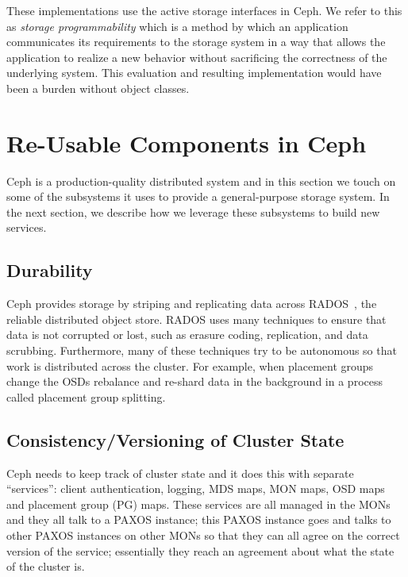 \documentclass[10pt,twocolumn]{article}
\begin{document}
These implementations use the active storage interfaces in Ceph. We
refer to this as \emph{storage programmability} which is a method by
which an application communicates its requirements to the storage system
in a way that allows the application to realize a new behavior without
sacrificing the correctness of the underlying system. This evaluation
and resulting implementation would have been a burden without object
classes.

\section{Re-Usable Components in
Ceph}\label{re-usable-components-in-ceph}

\label{background}

Ceph is a production-quality distributed system and in this section we
touch on some of the subsystems it uses to provide a general-purpose
storage system. In the next section, we describe how we leverage these
subsystems to build new services.

\subsection{Durability}\label{durability}

Ceph provides storage by striping and replicating data across RADOS~\cite{weil_rados_2007}, the reliable distributed object store. RADOS
uses many techniques to ensure that data is not corrupted or lost, such
as erasure coding, replication, and data scrubbing. Furthermore, many of
these techniques try to be autonomous so that work is distributed across
the cluster. For example, when placement groups change the OSDs
rebalance and re-shard data in the background in a process called
placement group splitting.

\subsection{Consistency/Versioning of Cluster
State}\label{consistencyversioning-of-cluster-state}

Ceph needs to keep track of cluster state and it does this with separate
``services'': client authentication, logging, MDS maps, MON maps, OSD
maps and placement group (PG) maps. These services are all managed in
the MONs and they all talk to a PAXOS instance; this PAXOS instance goes
and talks to other PAXOS instances on other MONs so that they can all
agree on the correct version of the service; essentially they reach an
agreement about what the state of the cluster is.
\end{document}
